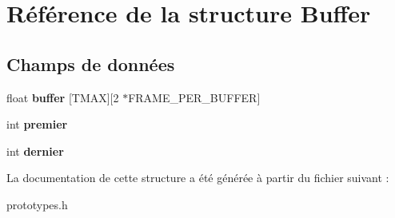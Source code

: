 \hypertarget{structBuffer}{}\section{Référence de la structure Buffer}
\label{structBuffer}
\subsection*{Champs de données}
\begin{DoxyCompactItemize}
\item 
float {\bfseries buffer} \mbox{[}T\+M\+AX\mbox{]}\mbox{[}2 $\ast$F\+R\+A\+M\+E\+\_\+\+P\+E\+R\+\_\+\+B\+U\+F\+F\+ER\mbox{]}\hypertarget{structBuffer_a103c2c1915233ee3cef2568fcd955350}{}\label{structBuffer_a103c2c1915233ee3cef2568fcd955350}

\item 
int {\bfseries premier}\hypertarget{structBuffer_a63cd490315219923d992ab74d6d3e582}{}\label{structBuffer_a63cd490315219923d992ab74d6d3e582}

\item 
int {\bfseries dernier}\hypertarget{structBuffer_a64286cbea99392b211cc640b3ff916b2}{}\label{structBuffer_a64286cbea99392b211cc640b3ff916b2}

\end{DoxyCompactItemize}


La documentation de cette structure a été générée à partir du fichier suivant \+:\begin{DoxyCompactItemize}
\item 
prototypes.\+h\end{DoxyCompactItemize}

